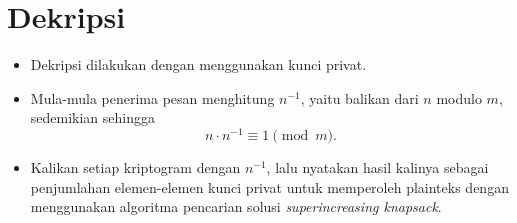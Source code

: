 \documentclass{article}
\begin{document}

\section*{Dekripsi}

\begin{itemize}
    \item Dekripsi dilakukan dengan menggunakan kunci privat.
    \item Mula-mula penerima pesan menghitung $n^{-1}$, yaitu balikan dari $n$ modulo $m$, sedemikian sehingga
    \[ n \cdot n^{-1} \equiv 1 \pmod{m}. \]
    \item Kalikan setiap kriptogram dengan $n^{-1}$, lalu nyatakan hasil kalinya sebagai penjumlahan elemen-elemen kunci privat untuk memperoleh plainteks dengan menggunakan algoritma pencarian solusi \textit{superincreasing knapsack}.
\end{itemize}
\end{document}
